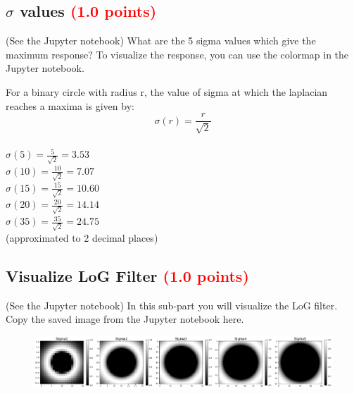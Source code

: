 \documentclass[answers]{exam}
\newcommand{\mypoints}[1]{\textcolor{red}{(#1 points)}}
\begin{document}
\subsection{$\sigma$ values \mypoints{1.0}}
(See the Jupyter notebook) What are the 5 sigma values which give the maximum response? To visualize the response, you can use the colormap in the Jupyter notebook.
\begin{solution}
For a binary circle with radius r, the value of sigma at which the laplacian reaches a maxima is given by:\\
$$\sigma(r) = \frac{r}{\sqrt{2}}$$\\
$\sigma(5) = \frac{5}{\sqrt{2}} = 3.53$\\
$\sigma(10) = \frac{10}{\sqrt{2}} = 7.07$\\
$\sigma(15) = \frac{15}{\sqrt{2}} = 10.60$\\
$\sigma(20) = \frac{20}{\sqrt{2}} = 14.14$\\
$\sigma(35) = \frac{35}{\sqrt{2}} = 24.75$\\
(approximated to 2 decimal places)
\end{solution}

\subsection{Visualize LoG Filter \mypoints{1.0}}
(See the Jupyter notebook) In this sub-part you will visualize the LoG filter. Copy the saved image from the Jupyter notebook here. 
\begin{solution}
\begin{figure}[H]
    \centering
    \includegraphics[width=1.0\linewidth]{Images/question_2_7.pdf}
\end{figure}
\end{solution}
\end{document}

